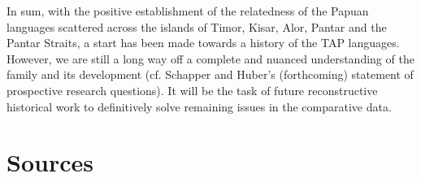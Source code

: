  

In sum, with the positive establishment of the relatedness of the Papuan languages scattered across the islands of Timor, Kisar, Alor, Pantar and the Pantar Straits, a start has been made towards a history of the TAP languages. However, we are still a long way off a complete and nuanced understanding of the family and its development (cf. Schapper and Huber's (forthcoming) statement of prospective research questions). It will be the task of future reconstructive historical work to definitively solve remaining issues in the comparative data. 


\section*{Sources}



